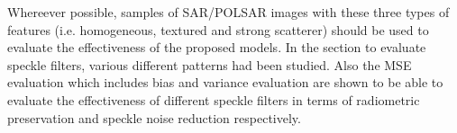 \replyToComment
    {Whereever possible, samples of SAR/POLSAR images with these three types of features (i.e. homogeneous, textured and strong scatterer) should be used to evaluate the effectiveness of the proposed models.}
    {In the section to evaluate speckle filters, various different patterns had been studied. Also the MSE evaluation which includes bias and variance evaluation are shown to be able to evaluate the effectiveness of different speckle filters in terms of radiometric preservation and speckle noise reduction respectively.}
    

